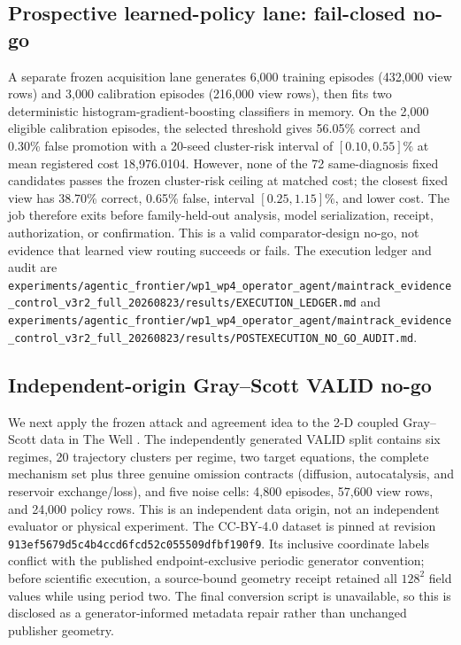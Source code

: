 \documentclass{article}
\begin{document}
\subsection{Prospective learned-policy lane: fail-closed no-go}
A separate frozen acquisition lane generates 6,000 training episodes (432,000 view rows) and
3,000 calibration episodes (216,000 view rows), then fits two deterministic
histogram-gradient-boosting classifiers in memory. On the 2,000 eligible calibration episodes,
the selected threshold gives 56.05\% correct and 0.30\% false promotion with a 20-seed
cluster-risk interval of $[0.10,0.55]\%$ at mean registered cost 18,976.0104. However, none of the
72 same-diagnosis fixed candidates passes the frozen cluster-risk ceiling at matched cost; the
closest fixed view has 38.70\% correct, 0.65\% false, interval $[0.25,1.15]\%$, and lower cost.
The job therefore exits before family-held-out analysis, model serialization, receipt,
authorization, or confirmation. This is a valid comparator-design no-go, not evidence that learned
view routing succeeds or fails. The execution ledger and audit are
\nolinkurl{experiments/agentic_frontier/wp1_wp4_operator_agent/maintrack_evidence_control_v3r2_full_20260823/results/EXECUTION_LEDGER.md}
and \nolinkurl{experiments/agentic_frontier/wp1_wp4_operator_agent/maintrack_evidence_control_v3r2_full_20260823/results/POSTEXECUTION_NO_GO_AUDIT.md}.

\subsection{Independent-origin Gray--Scott VALID no-go}
We next apply the frozen attack and agreement idea to the 2-D coupled Gray--Scott data in The
Well \citep{ohana2024well}. The independently generated VALID split contains six regimes, 20
trajectory clusters per regime, two target equations, the complete mechanism set plus three
genuine omission contracts (diffusion, autocatalysis, and reservoir exchange/loss), and five
noise cells: 4,800 episodes, 57,600 view rows, and 24,000 policy rows. This is an independent
data origin, not an independent evaluator or physical experiment.
The CC-BY-4.0 dataset is pinned at revision
\nolinkurl{913ef5679d5c4b4ccd6fcd52c055509dfbf190f9}. Its inclusive coordinate labels conflict
with the published endpoint-exclusive periodic generator convention; before scientific execution,
a source-bound geometry receipt retained all $128^2$ field values while using period two. The
final conversion script is unavailable, so this is disclosed as a generator-informed metadata
repair rather than unchanged publisher geometry.
\end{document}
